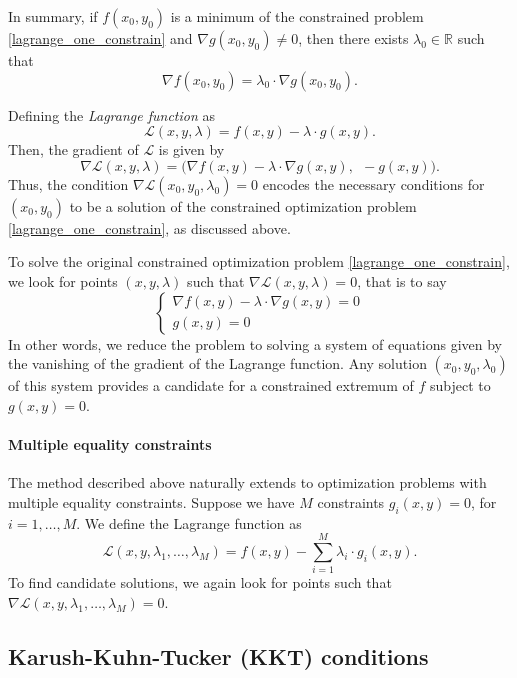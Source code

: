 \documentclass{amsart}
\newcommand{\R}{\mathbb{R}}
\begin{document}
In summary, if $f(x_0,y_0)$ is a minimum of the constrained problem \eqref{lagrange_one_constrain} and $\nabla g(x_0,y_0)\neq 0$, then there exists $\lambda_0\in\R$ such that
\[
    \nabla f(x_0,y_0)= \lambda_0\cdot \nabla g(x_0,y_0).
\]

\bigskip

Defining the {\it Lagrange function} as
\[
    \mathcal{L}(x,y,\lambda)= f(x,y) -\lambda\cdot g(x,y).
\]
Then, the gradient of $\mathcal{L}$ is given by
\[
    \nabla\mathcal{L}(x,y,\lambda)=
    \Big(
        \nabla f(x,y) -\lambda\cdot \nabla g(x,y),\ \
        -g(x,y)
    \Big).
\]
Thus, the condition $\nabla\mathcal{L}(x_0,y_0,\lambda_0)=0$ encodes the necessary conditions for $(x_0,y_0)$ to be a solution of the constrained optimization problem \eqref{lagrange_one_constrain}, as discussed above.

\bigskip

To solve the original constrained optimization problem \eqref{lagrange_one_constrain}, we look for points $(x,y,\lambda)$ such that $\nabla\mathcal{L}(x,y,\lambda)=0$, that is to say
\[\begin{cases}
    \nabla f(x,y) -\lambda\cdot \nabla g(x,y)= 0\\
    g(x,y)= 0
\end{cases}\]
In other words, we reduce the problem to solving a system of equations given by the vanishing of the gradient of the Lagrange function. Any solution $(x_0,y_0,\lambda_0)$ of this system provides a candidate for a constrained extremum of $f$ subject to $g(x,y)=0$.

\bigskip

\paragraph{\bf Multiple equality constraints}

The method described above naturally extends to optimization problems with multiple equality constraints. Suppose we have $M$ constraints $g_i(x,y)=0$, for $i=1,\ldots, M$. We define the Lagrange function as
\[
    \mathcal{L}(x,y,\lambda_1,\ldots,\lambda_M)= f(x,y) -\sum_{i=1}^M \lambda_i\cdot g_i(x,y).
\]
To find candidate solutions, we again look for points such that $\nabla\mathcal{L}(x,y,\lambda_1,\ldots,\lambda_M)=0$.

\subsection{Karush-Kuhn-Tucker (KKT) conditions}
\end{document}
